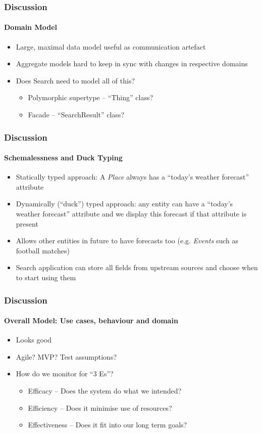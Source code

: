 \documentclass{beamer}
\begin{document}
\begin{frame}
  \frametitle{Discussion}
  \framesubtitle{Domain Model}
  \begin{itemize}
    \item Large, maximal data model useful as communication artefact
    \item Aggregate models hard to keep in sync with changes in respective domains
    \item Does Search need to model all of this?
      \begin{itemize}
        \item Polymorphic supertype -- ``Thing'' class?
        \item Facade -- ``SearchResult'' class?
      \end{itemize}
  \end{itemize}
\end{frame}

\begin{frame}
  \frametitle{Discussion}
  \framesubtitle{Schemalessness and Duck Typing}
  \begin{itemize}
    \item Statically typed approach: A \emph{Place} always has a ``today's weather forecast'' attribute
    \item Dynamically (``duck'') typed approach: any entity can have a ``today's weather forecast'' attribute and we display this forecast if that attribute is present
    \item Allows other entities in future to have forecasts too (e.g. \emph{Events} such as football matches)
    \item Search application can store all fields from upstream sources and choose when to start using them
  \end{itemize}
\end{frame}

\begin{frame}
  \frametitle{Discussion}
  \framesubtitle{Overall Model: Use cases, behaviour and domain}
  \begin{itemize}
    \item Looks good
    \item Agile? MVP? Test assumptions?
    \item How do we monitor for ``3 Es''?
      \pause \begin{itemize}
        \item Efficacy -- Does the system do what we intended?
        \item Efficiency -- Does it minimise use of resources?
        \item Effectiveness -- Does it fit into our long term goals?
      \end{itemize}
  \end{itemize}
\end{frame}
\end{document}
